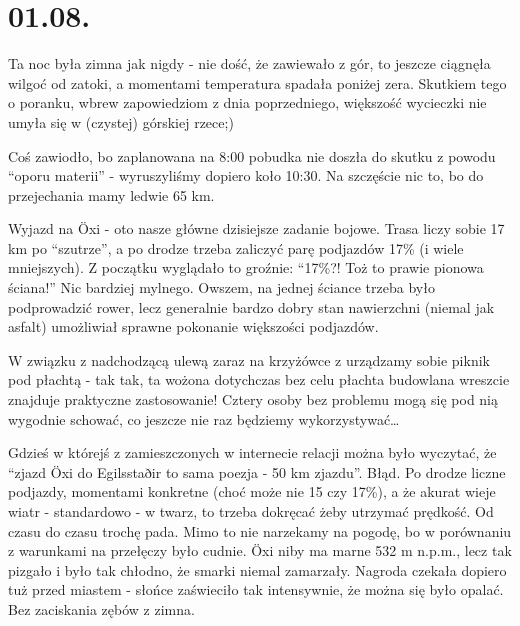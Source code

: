 \chapter*{01.08.}

Ta noc była zimna jak nigdy - nie dość, że zawiewało z gór, to jeszcze ciągnęła wilgoć od zatoki, a momentami temperatura spadała poniżej zera. Skutkiem tego o poranku, wbrew zapowiedziom z dnia poprzedniego, większość wycieczki nie umyła się w (czystej) górskiej rzece;)


Coś zawiodło, bo zaplanowana na 8:00 pobudka nie doszła do skutku z powodu “oporu materii” - wyruszyliśmy dopiero koło 10:30. Na szczęście nic to, bo do przejechania mamy ledwie 65 km.

Wyjazd na Öxi - oto nasze główne dzisiejsze zadanie bojowe. Trasa liczy sobie 17 km po “szutrze”, a po drodze trzeba zaliczyć parę podjazdów 17\% (i wiele mniejszych). Z początku wyglądało to groźnie: “17\%?! Toż to prawie pionowa ściana!” Nic bardziej mylnego. Owszem, na jednej ściance trzeba było podprowadzić rower, lecz generalnie bardzo dobry stan nawierzchni (niemal jak asfalt) umożliwiał sprawne pokonanie większości podjazdów.


W związku z nadchodzącą ulewą zaraz na krzyżówce z  urządzamy sobie piknik pod płachtą - tak tak, ta wożona dotychczas bez celu płachta budowlana wreszcie znajduje praktyczne zastosowanie! Cztery osoby bez problemu mogą się pod nią wygodnie schować, co jeszcze nie raz będziemy wykorzystywać…

Gdzieś w którejś z zamieszczonych w internecie relacji można było wyczytać, że “zjazd Öxi do Egilsstaðir to sama poezja - 50 km zjazdu”. Błąd. Po drodze liczne podjazdy, momentami konkretne (choć może nie 15 czy 17\%), a że akurat wieje wiatr - standardowo - w twarz, to trzeba dokręcać żeby utrzymać prędkość. Od czasu do czasu trochę pada. Mimo to nie narzekamy na pogodę, bo w porównaniu z warunkami na przełęczy było cudnie. Öxi niby ma marne 532 m n.p.m., lecz tak pizgało i było tak chłodno, że smarki niemal zamarzały. Nagroda czekała dopiero tuż przed miastem - słońce zaświeciło tak intensywnie, że można się było opalać. Bez zaciskania zębów z zimna.

